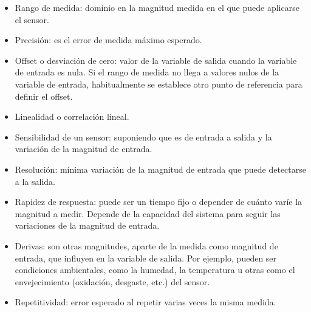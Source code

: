 	\begin{itemize}
		\item Rango de medida: dominio en la magnitud medida en el que puede aplicarse el sensor.
		
		\item Precisión: es el error de medida máximo esperado.
		
		\item Offset o desviación de cero:  valor de la variable de salida cuando la variable de entrada es nula. Si el rango de medida no llega a valores nulos de la variable de entrada, habitualmente se establece otro punto de referencia para definir el offset.
		
		\item Linealidad o correlación lineal.
		
		\item Sensibilidad de un sensor: suponiendo que es de entrada a salida y la variación de la magnitud de entrada.
		
		\item Resolución: mínima variación de la magnitud de entrada que puede detectarse a la salida.
		
		\item Rapidez de respuesta: puede ser un tiempo fijo o depender de cuánto varíe la magnitud a medir. Depende de la capacidad del sistema para seguir las variaciones de la magnitud de entrada.
		
		\clearpage
		\thispagestyle{plain}
		
		\item Derivas: son otras magnitudes, aparte de la medida como magnitud de entrada, que influyen en la variable de salida. Por ejemplo, pueden ser condiciones ambientales, como la humedad, la temperatura u otras como el envejecimiento (oxidación, desgaste, etc.) del sensor.
		
		\item Repetitividad: error esperado al repetir varias veces la misma medida.
	\end{itemize}

